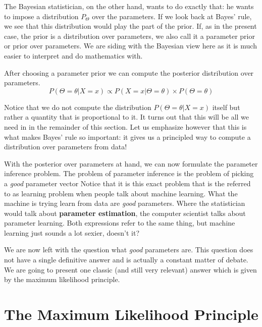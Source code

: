 The Bayesian statistician, on the other hand, wants to do exactly that: he wants to impose a distribution $ P_{\Theta} $ over the parameters. 
If we look back at Bayes' rule, we see that this distribution would play the part of the prior. If, as in the present case, the prior is a distribution over parameters,
we also call it a parameter prior or prior over parameters. We are siding with the Bayesian view here as it is much easier to interpret and do mathematics with.

After choosing a parameter prior we can compute the posterior distribution over parameters.
\begin{equation}
P(\Theta = \theta|X =x) \propto P(X=x|\Theta = \theta) \times P(\Theta = \theta)
\end{equation}

Notice that we do not compute the distribution $ P(\Theta = \theta|X =x) $ itself but rather a quantity that is proportional to it. It turns out that this will be all
we need in in the remainder of this section. Let us emphasize however that this is what makes Bayes' rule so important: it gives us a principled way to compute a
distribution over parameters from data!

With the posterior over parameters at hand, we can now formulate the parameter inference problem. The problem of parameter inference is the problem of picking
a \emph{good} parameter vector Notice that it is this exact problem that is the referred to as learning
problem when people talk about machine learning. What the machine is trying learn from data are \emph{good} parameters. Where the statistician would talk about
\textbf{parameter estimation}, the computer scientist talks about parameter learning. Both expressions refer to the same thing, but machine learning just sounds a lot
sexier, doesn't it?

We are now left with the question what \emph{good} parameters are. This question does not have a single definitive answer and is actually a constant matter of debate. We
are going to present one classic (and still very relevant) answer which is given by the maximum likelihood principle.


\section{The Maximum Likelihood Principle}


